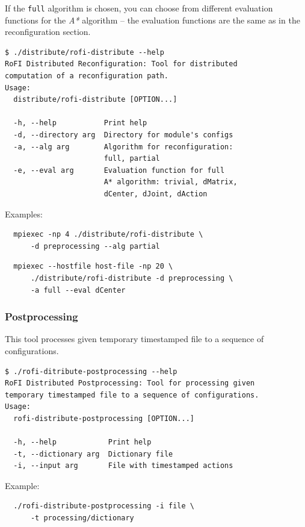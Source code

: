 \documentclass[
  printed, %
  oneside, %
  notable,   %
  nolof,     %
  nolot,     %
]{fithesis3}
\begin{document}
If the \texttt{full} algorithm is chosen, you can choose from different evaluation functions for the \textit{A*} algorithm -- the evaluation functions are the same as in the reconfiguration section. 

\begin{verbatim}
$ ./distribute/rofi-distribute --help
RoFI Distributed Reconfiguration: Tool for distributed 
computation of a reconfiguration path.
Usage:
  distribute/rofi-distribute [OPTION...]

  -h, --help           Print help
  -d, --directory arg  Directory for module's configs
  -a, --alg arg        Algorithm for reconfiguration: 
                       full, partial
  -e, --eval arg       Evaluation function for full 
                       A* algorithm: trivial, dMatrix, 
                       dCenter, dJoint, dAction
\end{verbatim}
Examples:

\begin{verbatim}
  mpiexec -np 4 ./distribute/rofi-distribute \
      -d preprocessing --alg partial 
\end{verbatim}

\begin{verbatim}
  mpiexec --hostfile host-file -np 20 \
      ./distribute/rofi-distribute -d preprocessing \ 
      -a full --eval dCenter
\end{verbatim}

\subsubsection*{Postprocessing}

This tool processes given temporary timestamped file to a sequence of configurations. 

\begin{verbatim}
$ ./rofi-ditribute-postprocessing --help
RoFI Distributed Postprocessing: Tool for processing given
temporary timestamped file to a sequence of configurations. 
Usage:
  rofi-distribute-postprocessing [OPTION...]
  
  -h, --help            Print help
  -t, --dictionary arg  Dictionary file
  -i, --input arg       File with timestamped actions 
\end{verbatim}
Example: 

\begin{verbatim}
  ./rofi-distribute-postprocessing -i file \
      -t processing/dictionary
\end{verbatim}
\end{document}
